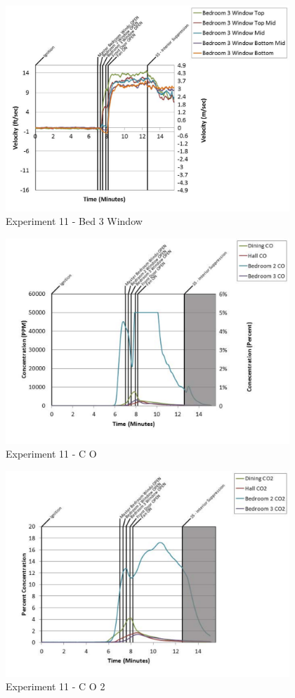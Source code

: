 \documentclass{article}
\begin{document}
\begin{appendices}
	\begin{figure}[h!]
		\centering
		\includegraphics[height=3.05in]{0_Images/Results_Charts/Exp_11_Charts/Bed3Window.pdf}
		\caption{Experiment 11 - Bed 3 Window}
	\end{figure}
 
	\clearpage

	\begin{figure}[h!]
		\centering
		\includegraphics[height=3.05in]{0_Images/Results_Charts/Exp_11_Charts/CO.pdf}
		\caption{Experiment 11 - C O}
	\end{figure}
 

	\begin{figure}[h!]
		\centering
		\includegraphics[height=3.05in]{0_Images/Results_Charts/Exp_11_Charts/CO2.pdf}
		\caption{Experiment 11 - C O 2}
	\end{figure}
 

\end{appendices}
\end{document}

